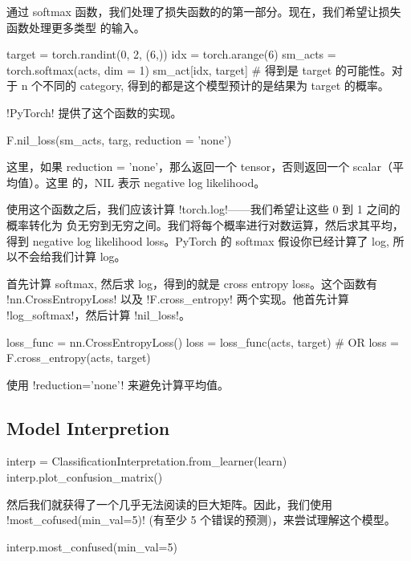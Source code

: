 \documentclass{ctexart}
\newenvironment{monos}{\VerbatimEnvironment\begin{pythoncode}}{\end{pythoncode}}
\begin{document}
通过 softmax 函数，我们处理了损失函数的的第一部分。现在，我们希望让损失函数处理更多类型
的输入。

\begin{monos}
target = torch.randint(0, 2, (6,))
idx = torch.arange(6)
sm_acts = torch.softmax(acts, dim = 1)
sm_act[idx, target] # 得到是 target 的可能性。对于 n 个不同的 category, 得到的都是这个模型预计的是结果为 target 的概率。
\end{monos}

\mono!PyTorch! 提供了这个函数的实现。

\begin{monos}
F.nil_loss(sm_acts, targ, reduction = 'none')
\end{monos}

这里，如果 reduction = 'none'，那么返回一个 tensor，否则返回一个 scalar（平均值）。这里
的，NIL 表示 negative log likelihood。

使用这个函数之后，我们应该计算 \mono!torch.log!——我们希望让这些 0 到 1 之间的概率转化为
负无穷到无穷之间。我们将每个概率进行对数运算，然后求其平均，得到 negative log
likelihood loss。PyTorch 的 softmax 假设你已经计算了 log, 所以不会给我们计算 log。

首先计算 softmax, 然后求 log，得到的就是 cross entropy loss。这个函数有 \\
\mono!nn.CrossEntropyLoss! 以及 \mono!F.cross_entropy! 两个实现。他首先计算 \mono!log_softmax!，然后计算 \mono!nil_loss!。

\begin{monos}
loss_func = nn.CrossEntropyLoss()
loss = loss_func(acts, target)
# OR
loss = F.cross_entropy(acts, target)
\end{monos}

使用 \mono!reduction='none'! 来避免计算平均值。

\subsection{Model Interpretion}

\begin{monos}
interp = ClassificationInterpretation.from_learner(learn)
interp.plot_confusion_matrix()
\end{monos}

然后我们就获得了一个几乎无法阅读的巨大矩阵。因此，我们使用
\mono!most_cofused(min_val=5)! (有至少 5 个错误的预测)，来尝试理解这个模型。

\begin{monos}
interp.most_confused(min_val=5)
\end{monos}
\end{document}
